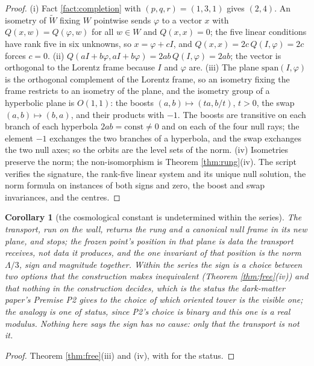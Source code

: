 \documentclass[11pt]{article}
\newtheorem{corollary}[theorem]{Corollary}
\theoremstyle{definition}
\begin{document}
\begin{proof}
(i) Fact \ref{fact:completion} with $(p,q,r) = (1,3,1)$ gives $(2,4)$. An isometry of $\widetilde W$ fixing $W$ pointwise sends $\varphi$ to a vector $x$ with $Q(x, w) = Q(\varphi, w)$ for all $w \in W$ and $Q(x,x) = 0$; the five linear conditions have rank five in six unknowns, so $x = \varphi + cI$, and $Q(x,x) = 2c\,Q(I,\varphi) = 2c$ forces $c = 0$. (ii) $Q(aI + b\varphi, aI + b\varphi) = 2ab\,Q(I,\varphi) = 2ab$; the vector is orthogonal to the Lorentz frame because $I$ and $\varphi$ are. (iii) The plane $\mathrm{span}(I,\varphi)$ is the orthogonal complement of the Lorentz frame, so an isometry fixing the frame restricts to an isometry of the plane, and the isometry group of a hyperbolic plane is $O(1,1)$: the boosts $(a,b) \mapsto (ta, b/t)$, $t > 0$, the swap $(a,b) \mapsto (b,a)$, and their products with $-1$. The boosts are transitive on each branch of each hyperbola $2ab = \text{const} \neq 0$ and on each of the four null rays; the element $-1$ exchanges the two branches of a hyperbola, and the swap exchanges the two null axes; so the orbits are the level sets of the norm. (iv) Isometries preserve the norm; the non-isomorphism is Theorem \ref{thm:rung}(iv). The script verifies the signature, the rank-five linear system and its unique null solution, the norm formula on instances of both signs and zero, the boost and swap invariances, and the centres.
\end{proof}

\begin{corollary}[the cosmological constant is undetermined within the series]\label{cor:uncaused}
The transport, run on the wall, returns the rung and a canonical null frame in its new plane, and stops; the frozen point's position in that plane is data the transport receives, not data it produces, and the one invariant of that position is the norm $\Lambda/3$, sign and magnitude together. Within the series the sign is a choice between two options that the construction makes inequivalent (Theorem \ref{thm:free}(iv)) and that nothing in the construction decides, which is the status the dark-matter paper's Premise P2 gives to the choice of which oriented tower is the visible one; the analogy is one of status, since P2's choice is binary and this one is a real modulus. Nothing here says the sign has no cause: only that the transport is not it.
\end{corollary}

\begin{proof}
Theorem \ref{thm:free}(iii) and (iv), with \cite[Premise P2]{ButlerT14} for the status.
\end{proof}
\end{document}

